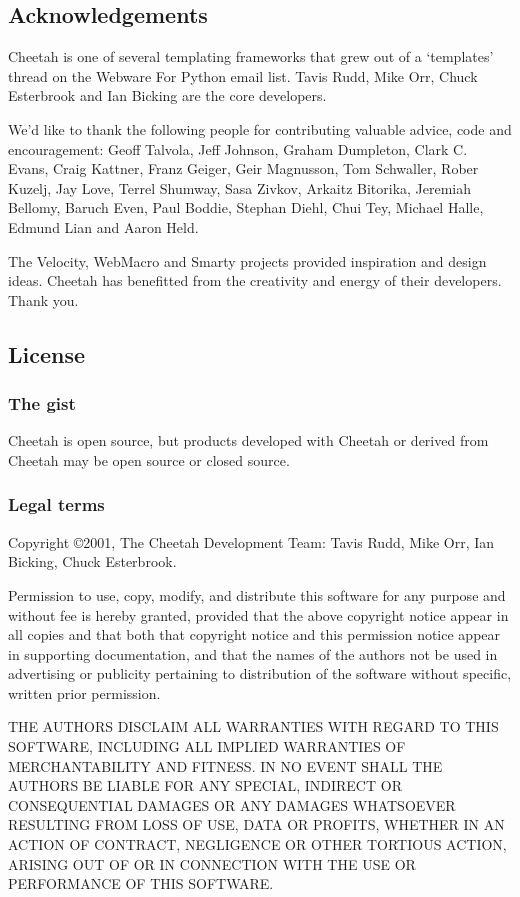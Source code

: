 \subsection{Acknowledgements}
\label{intro.acknowledgments}
    
Cheetah is one of several templating frameworks that grew out of a `templates'
thread on the Webware For Python email list.  Tavis Rudd, Mike Orr, Chuck
Esterbrook and Ian Bicking are the core developers.

We'd like to thank the following people for contributing valuable advice, code
and encouragement: Geoff Talvola, Jeff Johnson, Graham Dumpleton, Clark C.
Evans, Craig Kattner, Franz Geiger, Geir Magnusson, Tom Schwaller, Rober Kuzelj,
Jay Love, Terrel Shumway, Sasa Zivkov, Arkaitz Bitorika, Jeremiah Bellomy,
Baruch Even, Paul Boddie, Stephan Diehl, Chui Tey, Michael Halle, Edmund Lian
and Aaron Held.
    
The Velocity, WebMacro and Smarty projects provided inspiration and design
ideas.  Cheetah has benefitted from the creativity and energy of their
developers. Thank you.

\subsection{License}
\label{intro.license}

\subsubsection{The gist}
Cheetah is open source, but products developed with Cheetah or derived
from Cheetah may be open source or closed source.

\subsubsection{Legal terms}
Copyright \copyright 2001, The Cheetah Development Team: Tavis Rudd, Mike Orr,
Ian Bicking, Chuck Esterbrook.

Permission to use, copy, modify, and distribute this software for any purpose
and without fee is hereby granted, provided that the above copyright notice
appear in all copies and that both that copyright notice and this permission
notice appear in supporting documentation, and that the names of the authors not
be used in advertising or publicity pertaining to distribution of the software
without specific, written prior permission.

THE AUTHORS DISCLAIM ALL WARRANTIES WITH REGARD TO THIS SOFTWARE, INCLUDING ALL
IMPLIED WARRANTIES OF MERCHANTABILITY AND FITNESS. IN NO EVENT SHALL THE AUTHORS
BE LIABLE FOR ANY SPECIAL, INDIRECT OR CONSEQUENTIAL DAMAGES OR ANY DAMAGES
WHATSOEVER RESULTING FROM LOSS OF USE, DATA OR PROFITS, WHETHER IN AN ACTION OF
CONTRACT, NEGLIGENCE OR OTHER TORTIOUS ACTION, ARISING OUT OF OR IN CONNECTION
WITH THE USE OR PERFORMANCE OF THIS SOFTWARE.

